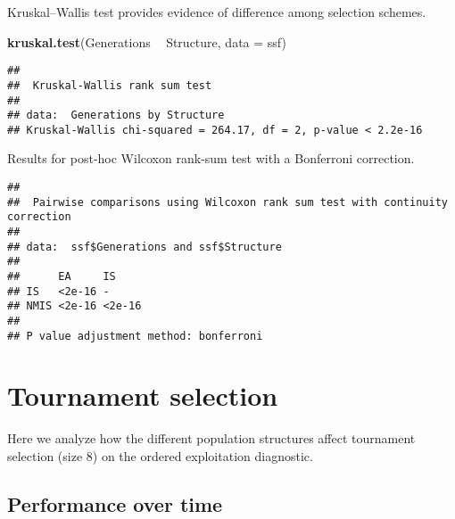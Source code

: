 \documentclass[]{book}
\newenvironment{Shaded}{\begin{snugshade}}{\end{snugshade}}
\newcommand{\DataTypeTok}[1]{\textcolor[rgb]{0.13,0.29,0.53}{#1}}
\newcommand{\KeywordTok}[1]{\textcolor[rgb]{0.13,0.29,0.53}{\textbf{#1}}}
\newcommand{\NormalTok}[1]{#1}
\newcommand{\OperatorTok}[1]{\textcolor[rgb]{0.81,0.36,0.00}{\textbf{#1}}}
\newcommand{\OtherTok}[1]{\textcolor[rgb]{0.56,0.35,0.01}{#1}}
\newcommand{\StringTok}[1]{\textcolor[rgb]{0.31,0.60,0.02}{#1}}
\begin{document}
Kruskal--Wallis test provides evidence of difference among selection schemes.

\begin{Shaded}
\begin{Highlighting}[]
\KeywordTok{kruskal.test}\NormalTok{(Generations }\OperatorTok{~}\StringTok{ }\NormalTok{Structure, }\DataTypeTok{data =}\NormalTok{ ssf)}
\end{Highlighting}
\end{Shaded}

\begin{verbatim}
## 
##  Kruskal-Wallis rank sum test
## 
## data:  Generations by Structure
## Kruskal-Wallis chi-squared = 264.17, df = 2, p-value < 2.2e-16
\end{verbatim}

Results for post-hoc Wilcoxon rank-sum test with a Bonferroni correction.

\begin{Shaded}
\end{Shaded}

\begin{verbatim}
## 
##  Pairwise comparisons using Wilcoxon rank sum test with continuity correction 
## 
## data:  ssf$Generations and ssf$Structure 
## 
##      EA     IS    
## IS   <2e-16 -     
## NMIS <2e-16 <2e-16
## 
## P value adjustment method: bonferroni
\end{verbatim}

\hypertarget{tournament-selection-5}{%
\section{Tournament selection}\label{tournament-selection-5}}

Here we analyze how the different population structures affect tournament selection (size 8) on the ordered exploitation diagnostic.

\hypertarget{performance-over-time-13}{%
\subsection{Performance over time}\label{performance-over-time-13}}
\end{document}
